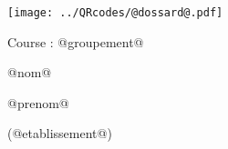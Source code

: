 \Huge

\begin{block} %



\vspace{0.5cm}


\begin{minipage}{0.38\linewidth}
\texttt{[image: ../QRcodes/@dossard@.pdf]}

\vspace{0.5cm}

	Course : @groupement@
\end{minipage}
\begin{minipage}{0.6\linewidth}
{}\hfill {}
{}\hfill {}

\bigskip

\begin{center}
@nom@

@prenom@

(@etablissement@)
\end{center}
\end{minipage}


\end{block}

\vfill